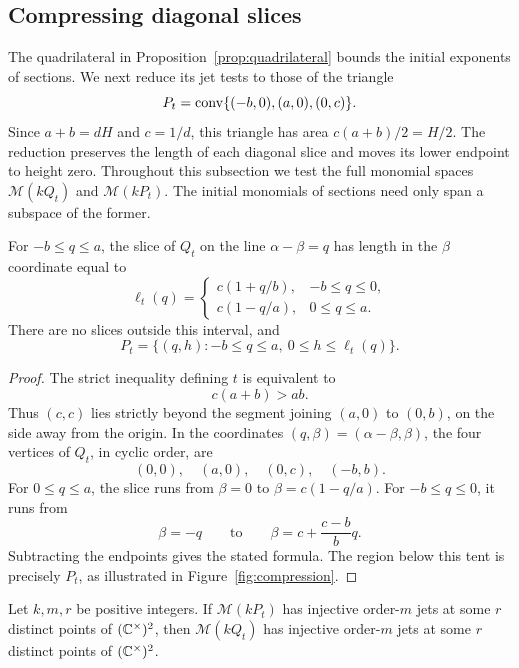 \subsection{Compressing diagonal slices}\label{sec:compression}

The quadrilateral in Proposition~\ref{prop:quadrilateral} bounds the initial
exponents of sections.  We next reduce its jet tests to those of the triangle
\[
 P_t=\operatorname{conv}\{(-b,0),(a,0),(0,c)\}.
\]
Since $a+b=dH$ and $c=1/d$, this triangle has area
$c(a+b)/2=H/2$.
The reduction preserves the length of each diagonal slice and moves its
lower endpoint to height zero.  Throughout this subsection we test the full
monomial spaces $\mathcal M(kQ_t)$ and $\mathcal M(kP_t)$.  The initial
monomials of sections need only span a subspace of the former.

\begin{lemma}\label{lem:slices}
For $-b\le q\le a$, the slice of $Q_t$ on the line
$\alpha-\beta=q$ has length in the $\beta$ coordinate equal to
\[
 \ell_t(q)=
 \begin{cases}
 c(1+q/b),&-b\le q\le0,\\[2pt]
 c(1-q/a),&0\le q\le a.
 \end{cases}
\]
There are no slices outside this interval, and
\[
 P_t=\{(q,h):-b\le q\le a,\ 0\le h\le\ell_t(q)\}.
\]
\end{lemma}

\begin{proof}
The strict inequality defining $t$ is equivalent to
\[
 c(a+b)>ab.
\]
Thus $(c,c)$ lies strictly beyond the segment joining $(a,0)$ to $(0,b)$,
on the side away from the origin.  In the coordinates
$(q,\beta)=(\alpha-\beta,\beta)$, the four vertices of $Q_t$, in cyclic
order, are
\[
 (0,0),\quad (a,0),\quad (0,c),\quad (-b,b).
\]
For $0\le q\le a$, the slice runs from $\beta=0$ to
$\beta=c(1-q/a)$.  For $-b\le q\le0$, it runs from
\[
 \beta=-q
 \qquad\text{to}\qquad
 \beta=c+\frac{c-b}{b}q.
\]
Subtracting the endpoints gives the stated formula.  The region below
this tent is precisely $P_t$, as illustrated in Figure~\ref{fig:compression}.
\end{proof}




\begin{proposition}\label{prop:compression}
Let $k,m,r$ be positive integers.  If $\mathcal M(kP_t)$ has injective
order-$m$ jets at some $r$ distinct points of $(\mathbb C^\times)^2$, then
$\mathcal M(kQ_t)$ has injective order-$m$ jets at some $r$ distinct
points of $(\mathbb C^\times)^2$.
\end{proposition}

